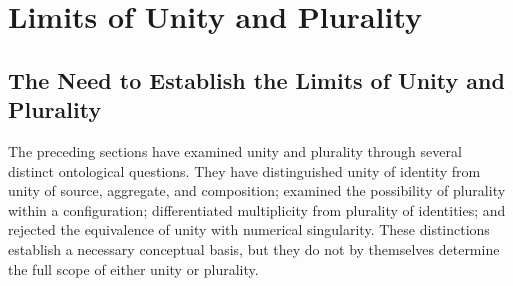 %
%
%
%
%

\section{Limits of Unity and Plurality}
\label{sec:limits-of-unity-and-plurality}

\subsection{The Need to Establish the Limits of Unity and Plurality}

The preceding sections have examined unity and plurality
through several distinct ontological questions. They have
distinguished unity of identity from unity of source,
aggregate, and composition; examined the possibility of
plurality within a configuration; differentiated multiplicity
from plurality of identities; and rejected the equivalence
of unity with numerical singularity. These distinctions
establish a necessary conceptual basis, but they do not
by themselves determine the full scope of either unity
or plurality.


